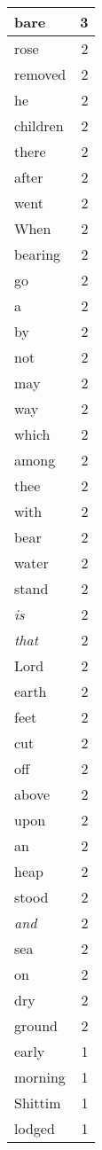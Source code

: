 \begin{center}
\begin{longtable}{l|r}
bare & 3 \\ \hline
rose & 2 \\ \hline
removed & 2 \\ \hline
he & 2 \\ \hline
children & 2 \\ \hline
there & 2 \\ \hline
after & 2 \\ \hline
went & 2 \\ \hline
When & 2 \\ \hline
bearing & 2 \\ \hline
go & 2 \\ \hline
a & 2 \\ \hline
by & 2 \\ \hline
not & 2 \\ \hline
may & 2 \\ \hline
way & 2 \\ \hline
which & 2 \\ \hline
among & 2 \\ \hline
thee & 2 \\ \hline
with & 2 \\ \hline
bear & 2 \\ \hline
water & 2 \\ \hline
stand & 2 \\ \hline
\emph{is} & 2 \\ \hline
\emph{that} & 2 \\ \hline
Lord & 2 \\ \hline
earth & 2 \\ \hline
feet & 2 \\ \hline
cut & 2 \\ \hline
off & 2 \\ \hline
above & 2 \\ \hline
upon & 2 \\ \hline
an & 2 \\ \hline
heap & 2 \\ \hline
stood & 2 \\ \hline
\emph{and} & 2 \\ \hline
sea & 2 \\ \hline
on & 2 \\ \hline
dry & 2 \\ \hline
ground & 2 \\ \hline
early & 1 \\ \hline
morning & 1 \\ \hline
Shittim & 1 \\ \hline
lodged & 1 \\ \hline

\end{longtable}
\end{center}
